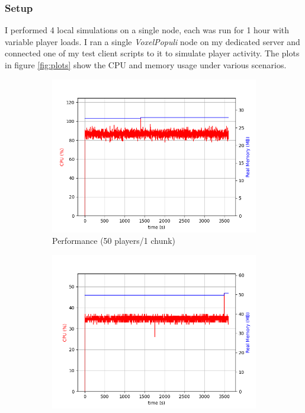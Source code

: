 \documentclass[12pt,notitlepage,a4paper]{report}
\newcommand{\voxpop}{\emph{VoxelPopuli}}
\begin{document}
	\subsubsection{Setup}
	I performed 4 local simulations on a single node, each was run for 1 hour with variable player loads. I ran a single \voxpop{} node on my dedicated server and connected one of my test client scripts to it to simulate player activity. The plots in figure \ref{fig:plots} show the CPU and memory usage under various scenarios.
	\begin{figure}
		\begin{subfigure}{0.5\textwidth}
			\includegraphics[width=\textwidth]{plot1.png}
			\caption{Performance (50 players/1 chunk)}
			\label{fig:plot1}
		\end{subfigure}
		\begin{subfigure}{0.5\textwidth}
			\includegraphics[width=\textwidth]{plot2.png}

\end{subfigure}
\end{figure}
\end{document}
